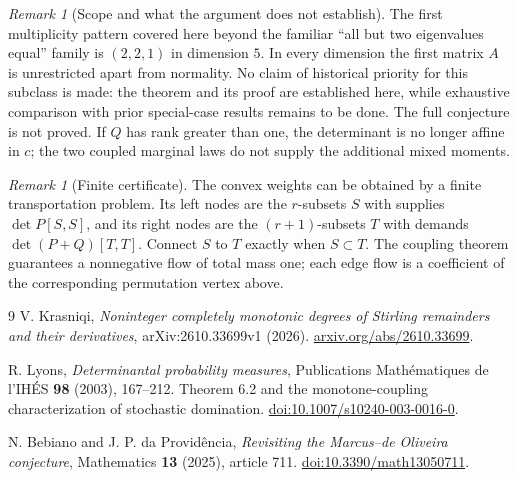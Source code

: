 \documentclass[11pt,a4paper]{article}
\theoremstyle{remark}
\newtheorem{remark}[theorem]{Remark}
\begin{document}
\begin{remark}[Scope and what the argument does not establish]
The first multiplicity pattern covered here beyond the familiar
``all but two eigenvalues equal'' family is $(2,2,1)$ in dimension
$5$. In every dimension the first matrix $A$ is unrestricted apart
from normality. No claim of historical priority for this subclass
is made: the theorem and its proof are established here, while
exhaustive comparison with prior special-case results remains to
be done. The full conjecture is not proved. If $Q$ has rank greater
than one, the determinant is no longer affine in $c$; the two
coupled marginal laws do not supply the additional mixed moments.
\end{remark}

\begin{remark}[Finite certificate]
The convex weights can be obtained by a finite transportation
problem. Its left nodes are the $r$-subsets $S$ with supplies
$\det P[S,S]$, and its right nodes are the $(r+1)$-subsets $T$
with demands $\det(P+Q)[T,T]$. Connect $S$ to $T$ exactly when
$S\subset T$. The coupling theorem guarantees a nonnegative flow
of total mass one; each edge flow is a coefficient of the
corresponding permutation vertex above.
\end{remark}

\begin{thebibliography}{9}
V. Krasniqi, \emph{Noninteger completely monotonic degrees of Stirling
remainders and their derivatives}, arXiv:2610.33699v1 (2026).
\href{https://arxiv.org/abs/2610.33699}{arxiv.org/abs/2610.33699}.

R. Lyons, \emph{Determinantal probability measures},
Publications Math\'ematiques de l'IH\'ES \textbf{98} (2003), 167--212.
Theorem 6.2 and the monotone-coupling characterization of stochastic
domination.
\href{https://doi.org/10.1007/s10240-003-0016-0}{doi:10.1007/s10240-003-0016-0}.

N. Bebiano and J. P. da Provid\^encia,
\emph{Revisiting the Marcus--de Oliveira conjecture},
Mathematics \textbf{13} (2025), article 711.
\href{https://doi.org/10.3390/math13050711}{doi:10.3390/math13050711}.
\end{thebibliography}
\end{document}

